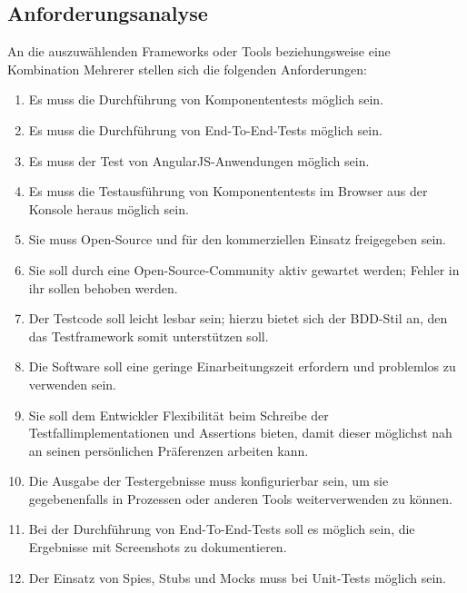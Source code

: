 \subsection{Anforderungsanalyse}
\label{sec:anforderungsanalyse}
An die auszuwählenden Frameworks oder Tools beziehungsweise eine Kombination Mehrerer stellen sich die folgenden Anforderungen:
\begin{enumerate}[label=\textbf{A\arabic*}]
	\item Es muss die Durchführung von Komponententests möglich sein.
	\item Es muss die Durchführung von End-To-End-Tests möglich sein.
	\item Es muss der Test von AngularJS-Anwendungen möglich sein.
	\item Es muss die Testausführung von Komponententests im Browser aus der Konsole heraus möglich sein.
	\item Sie muss Open-Source und für den kommerziellen Einsatz freigegeben sein.
	\item Sie soll durch eine Open-Source-Community aktiv gewartet werden; Fehler in ihr sollen behoben werden.
	\item Der Testcode soll leicht lesbar sein\cite[][7]{coba-programmierrichtlinienAllgemein}; hierzu bietet sich der BDD-Stil an, den das Testframework somit unterstützen soll.
	\item Die Software soll eine geringe Einarbeitungszeit erfordern und problemlos zu verwenden sein. 
	\item Sie soll dem Entwickler Flexibilität beim Schreibe der Testfallimplementationen und Assertions bieten, damit dieser möglichst nah an seinen persönlichen Präferenzen arbeiten kann.
	\item Die Ausgabe der Testergebnisse muss konfigurierbar sein, um sie gegebenenfalls in Prozessen oder anderen Tools weiterverwenden zu können.
	\item Bei der Durchführung von End-To-End-Tests soll es möglich sein, die Ergebnisse mit Screenshots zu dokumentieren.
	\item Der Einsatz von Spies, Stubs und Mocks muss bei Unit-Tests möglich sein.
\end{enumerate}

